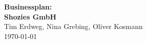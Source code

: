 \begin{titlepage}
		\centering

		\textbf{\huge{Businessplan:}}\\
		\vspace{0.5cm}
		\textbf{\huge{Shozies GmbH}}\\
		\vspace{5cm}
		\Large
		Tim Erdweg, Nina Grebing, Oliver Kosmann\\
		\today
\end{titlepage}